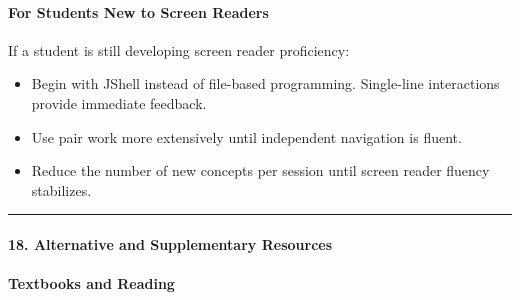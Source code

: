 \documentclass[
  justified,
  openright,
]{tufte-book}
\let\subsection\paragraph
\let\paragraph\paragraph
\let\subsection\paragraph
\let\paragraph\paragraph
\providecommand{\tightlist}{%
  \setlength{\itemsep}{0pt}\setlength{\parskip}{0pt}}
\begin{document}
\subsection{For Students New to Screen
Readers}\label{for-students-new-to-screen-readers}

If a student is still developing screen reader proficiency:

\begin{itemize}
\tightlist
\item
  Begin with JShell instead of file-based programming. Single-line
  interactions provide immediate feedback.
\item
  Use pair work more extensively until independent navigation is fluent.
\item
  Reduce the number of new concepts per session until screen reader
  fluency stabilizes.
\end{itemize}

\begin{center}\rule{0.5\linewidth}{0.5pt}\end{center}

\subsection{18. Alternative and Supplementary
Resources}\label{alternative-and-supplementary-resources-2}

\subsection{Textbooks and Reading}\label{textbooks-and-reading-2}
\end{document}
